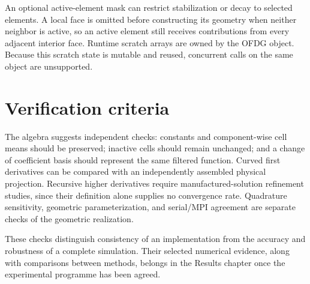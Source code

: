 An optional active-element mask can restrict stabilization or decay to selected
elements.  A local face is omitted before constructing its geometry when neither
neighbor is active, so an active
element still receives contributions from every adjacent interior face. Runtime
scratch arrays are owned by the OFDG object. Because this scratch state is
mutable and reused, concurrent calls on the same object are unsupported.


\section{Verification criteria}
\label{sec:verification-criteria}
The algebra suggests independent checks: constants and component-wise cell
means should be preserved; inactive cells should remain unchanged; and a
change of coefficient basis should represent the same filtered function.
Curved first derivatives can be compared with an independently assembled
physical projection. Recursive higher derivatives require manufactured-solution
refinement studies, since their definition alone supplies no convergence
rate. Quadrature sensitivity, geometric parameterization, and serial/MPI
agreement are separate checks of the geometric realization.

These checks distinguish consistency of an implementation from the accuracy
and robustness of a complete simulation. Their selected numerical evidence,
along with comparisons between methods, belongs in the Results chapter once
the experimental programme has been agreed.
